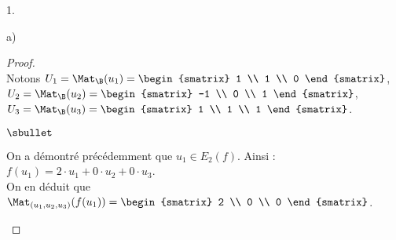 \begin{noliste}{1.}
\begin{noliste}{a)}
    \begin{proof}~\\
      Notons $U_1 = \Mat_{\B}(u_1) =
        \begin{smatrix}
          1 \\
          1 \\
          0
        \end{smatrix}$, $U_2 = \Mat_{\B}(u_2) =
        \begin{smatrix}
          -1 \\
          0 \\
          1
        \end{smatrix}$, $U_3 = \Mat_{\B}(u_3) = 
        \begin{smatrix}
          1 \\
          1 \\
          1
        \end{smatrix}$.
      \begin{noliste}{$\sbullet$}
      \item On a démontré précédemment que $u_1 \in E_2(f)$. Ainsi : $
        f(u_1) = 2 \cdot u_1 + 0 \cdot u_2+0\cdot u_3 $.\\[.2cm]
        On en déduit que $\Mat_{(u_1, u_2, u_3)}(f(u_1)) =
        \begin{smatrix}
          2 \\
          0 \\
          0
        \end{smatrix}
        $.


\end{noliste}
\end{proof}
\end{noliste}
\end{noliste}
